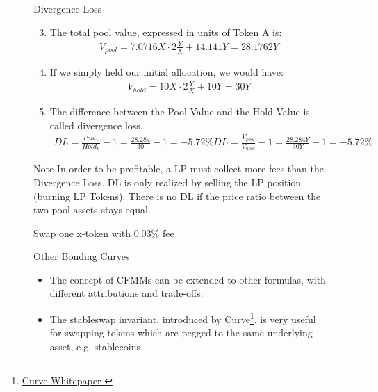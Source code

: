 \documentclass[]{beamer}
\begin{document}
\begin{minipage}{0.5\textwidth}
\begin{figure}[h!]
\begin{frame}{Divergence Loss}

	\begin{enumerate}
	\setcounter{enumi}{2}
		\item The total pool value, expressed in units of Token A is: 
			\begin{align*}
				V_{pool} = 7.0716 X \cdot 2 \tfrac{Y}{X} + 14.141 Y = 28.1762 Y
			\end{align*}
		\item If we simply held our initial allocation, we would have:
			\begin{align*}
			V_{hold} = 10 X \cdot 2 \tfrac{Y}{X} + 10 Y = 30 Y
			\end{align*}
		\item The difference between the Pool Value and the Hold Value is called divergence loss.
		\begin{align*}
			DL = \tfrac{Pool_V}{Hold_V} -1 = \tfrac{28.284}{30} - 1 = -5.72 \%
			DL = \tfrac{V_{pool}}{V_{hold}} -1 = \tfrac{28.284 Y}{30 Y} - 1 = -5.72 \%
			\end{align*}
	\end{enumerate}	
	
	\begin{keytakeaway}{Note}
		In order to be profitable, a LP must collect more fees than the Divergence Loss. DL is only realized by selling the LP position (burning LP Tokens). There is no DL if the price ratio between the two pool assets stays equal.
	\end{keytakeaway}
	
\end{frame}


\begin{frame}{Swap one x-token with 0.03\% fee}


\begin{frame}{Other Bonding Curves}

\begin{small}
\begin{itemize}
	\item The concept of CFMMs can be extended to other formulas, with different attributions and trade-offs. 
	\item The stableswap invariant, introduced by Curve\footnote{\href{https://curve.fi/files/stableswap-paper.pdf}{Curve Whitepaper \link}}, is very useful for swapping tokens which are pegged to the same underlying asset, e.g. stablecoins.
	\end{itemize}
\end{small}



\end{frame}
\end{frame}
\end{figure}
\end{minipage}
\end{document}
